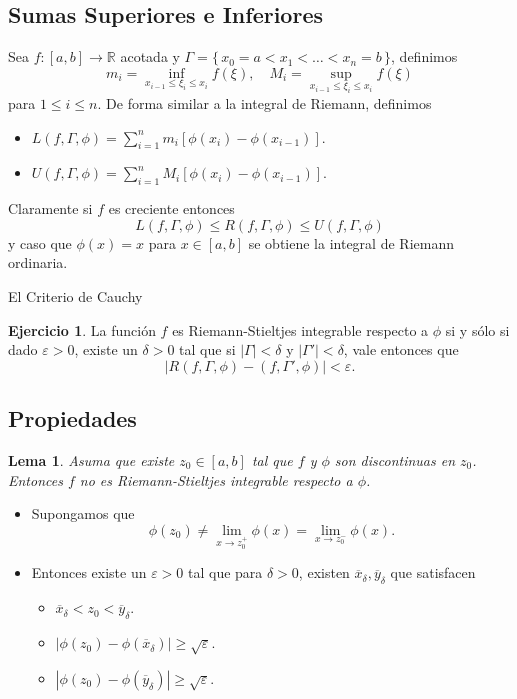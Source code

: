 \documentclass[utf8]{beamer}
\theoremstyle{plain}
\newtheorem{Lem}{Lema}                 %
\theoremstyle{definition}
\newtheorem{Ej}{Ejercicio}             %
\theoremstyle{remark}
\numberwithin{equation}{section}
\newcommand{\dl}{\delta}                %
\newcommand{\eps}{\varepsilon}          %
\newcommand{\Ga}{\Gamma}                %
\newcommand{\bR}{\mathbb{R}}    %
\newcommand{\set}[1]{\{\,#1\,\}}    %
\renewcommand{\geq}{\geqslant}          %
\renewcommand{\leq}{\leqslant}          %
\newcommand{\ov}{\overline}
\renewcommand{\.}{\Cdot}                %
\begin{document}
\subsection{Sumas Superiores e Inferiores}

\begin{frame}
  Sea $f:[a,b]\to\bR$ acotada y $\Ga=\set{x_0=a<x_1<\dots<x_n=b}$, definimos 
  $$m_i=\inf_{x_{i-1}\leq\xi_i\leq x_i} f(\xi),\quad M_i=\sup_{x_{i-1}\leq\xi_i\leq x_i} f(\xi)$$
  para $1\leq i\leq n$. De forma similar a la integral de Riemann, definimos
  \begin{itemize}
    \item $L(f,\Ga,\phi)=\sum_{i=1}^nm_i[\phi(x_i)-\phi(x_{i-1})].$
    \item $U(f,\Ga,\phi)=\sum_{i=1}^nM_i[\phi(x_i)-\phi(x_{i-1})].$
  \end{itemize}
  Claramente si $f$ es creciente entonces
  $$L(f,\Ga,\phi)\leq R(f,\Ga,\phi)\leq U(f,\Ga,\phi)$$
  y caso que $\phi(x)=x$ para $x\in [a,b]$ se obtiene la integral de Riemann ordinaria.
\end{frame}

\begin{frame}{El Criterio de Cauchy}
  \begin{Ej}\label{ej:CauchyRS}
    La función $f$ es Riemann-Stieltjes integrable respecto a $\phi$ si y sólo si dado $\eps>0$, existe un $\dl>0$ tal que si $|\Ga|<\dl$ y $|\Ga'|<\dl$, vale entonces que
    $$|R(f,\Ga,\phi)-(f,\Ga',\phi)|<\eps.$$
  \end{Ej}
\end{frame}

\subsection{Propiedades}

\begin{frame}
  \begin{Lem}\label{lem:NotRSIntCuando}
Asuma que existe $z_0\in [a,b]$ tal que $f$ y $\phi$ son discontinuas en $z_0$. Entonces $f$ no es Riemann-Stieltjes integrable respecto a $\phi$.
    \end{Lem}\begin{itemize}
      \item  Supongamos que 
    $$\phi(z_0)\neq\lim_{x\to z_0^+}\phi(x)=\lim_{x\to z_0^-}\phi(x).$$
    \item Entonces existe un $\eps>0$ tal que para $\dl>0$, existen $\ov x_\dl,\ov y_\dl$ que satisfacen 
    \begin{itemize}
      \item $\ov x_\dl<z_0<\ov y_\dl$.
      \item $|\phi(z_0)-\phi(\ov x_\dl)|\geq\sqrt{\eps}$.
      \item $|\phi(z_0)-\phi(\ov y_\dl)|\geq\sqrt{\eps}$.
    \end{itemize}
    \end{itemize}
\end{frame}
\end{document}
